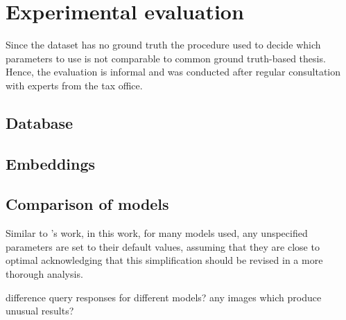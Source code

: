 \chapter{Experimental evaluation}\label{ch:evaluation}

Since the dataset has no ground truth the procedure used to decide which parameters to use is not comparable to common ground truth-based thesis.
Hence, the evaluation is informal and was conducted after regular consultation with experts from the tax office.

 \section{Database}\label{sec:eval-db}
 

 

 
 
\section{Embeddings}\label{sec:eval-embeddings}
















\section{Comparison of models}\label{sec:evaluation-models}

Similar to \citeauthor{glove2014}'s work, in this work, for many models used, any unspecified parameters are set to their default values, 
assuming that they are close to optimal
acknowledging that this simplification should be revised in a more thorough analysis.

difference query responses for different models?
any images which produce unusual results?
